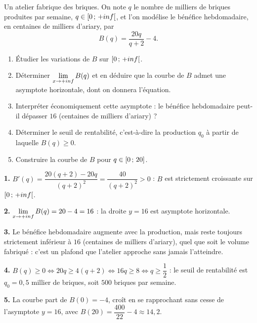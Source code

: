 \begin{jecherche}
Un atelier fabrique des briques. On note $q$ le nombre de milliers de briques
produites par semaine, $q \in \left[0\,;\,+inf\right[$, et l'on modélise le
bénéfice hebdomadaire, en centaines de milliers d'ariary, par
\[
  B(q) = \frac{20q}{q+2} - 4 .
\]

\begin{enumerate}[label=\textbf{\arabic*.}, leftmargin=*, itemsep=0.3em]
  \item Étudier les variations de $B$ sur $\left[0\,;\,+inf\right[$.
  \item Déterminer $\limpinf B(q)$ et en déduire que la courbe de $B$ admet
        une asymptote horizontale, dont on donnera l'équation.
  \item Interpréter économiquement cette asymptote : le bénéfice
        hebdomadaire peut-il dépasser $16$ (centaines de milliers d'ariary) ?
  \item Déterminer le seuil de rentabilité, c'est-à-dire la production $q_{0}$
        à partir de laquelle $B(q) \geq 0$.
  \item Construire la courbe de $B$ pour $q \in \left[0\,;\,20\right]$.
\end{enumerate}
\end{jecherche}

\begin{corrige}
\textbf{1.} $B'(q) = \dfrac{20(q+2)-20q}{(q+2)^{2}} = \dfrac{40}{(q+2)^{2}} > 0$ :
$B$ est strictement croissante sur $\left[0\,;\,+inf\right[$.

\textbf{2.} $\limpinf B(q) = 20-4 = 16$ : la droite $y=16$ est asymptote
horizontale.

\textbf{3.} Le bénéfice hebdomadaire augmente avec la production, mais reste
toujours strictement inférieur à $16$ (centaines de milliers d'ariary), quel
que soit le volume fabriqué : c'est un plafond que l'atelier approche sans
jamais l'atteindre.

\textbf{4.} $B(q) \geq 0 \iff 20q \geq 4(q+2) \iff 16q \geq 8 \iff q \geq
\dfrac12$ : le seuil de rentabilité est $q_{0} = 0{,}5$ millier de briques,
soit $500$ briques par semaine.

\textbf{5.} La courbe part de $B(0) = -4$, croît en se rapprochant sans
cesse de l'asymptote $y=16$, avec $B(20) = \dfrac{400}{22}-4 \approx 14{,}2$.
\end{corrige}

